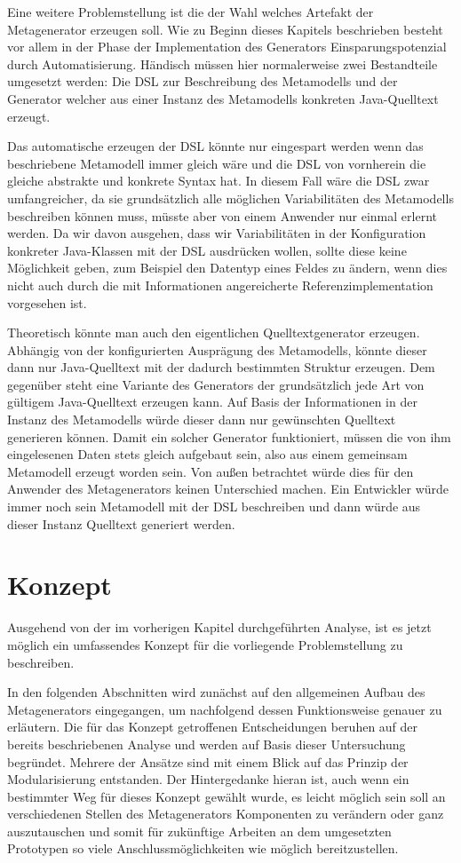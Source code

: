 \documentclass[12pt,oneside,a4paper,parskip]{scrbook}
\begin{document}
Eine weitere Problemstellung ist die der Wahl welches Artefakt der Metagenerator erzeugen soll. Wie zu Beginn dieses Kapitels beschrieben besteht vor allem in der Phase der Implementation des Generators Einsparungspotenzial durch Automatisierung. Händisch müssen hier normalerweise zwei Bestandteile umgesetzt werden: Die DSL zur Beschreibung des Metamodells und der Generator welcher aus einer Instanz des Metamodells konkreten Java-Quelltext erzeugt. 

Das automatische erzeugen der DSL könnte nur eingespart werden wenn das beschriebene Metamodell immer gleich wäre und die DSL von vornherein die gleiche abstrakte und konkrete Syntax hat. In diesem Fall wäre die DSL zwar umfangreicher, da sie grundsätzlich alle möglichen Variabilitäten des Metamodells beschreiben können muss, müsste aber von einem Anwender nur einmal erlernt werden. Da wir davon ausgehen, dass wir Variabilitäten in der Konfiguration konkreter Java-Klassen mit der DSL ausdrücken wollen, sollte diese keine Möglichkeit geben, zum Beispiel den Datentyp eines Feldes zu ändern, wenn dies nicht auch durch die mit Informationen angereicherte Referenzimplementation vorgesehen ist.

Theoretisch könnte man auch den eigentlichen Quelltextgenerator erzeugen. Abhängig von der konfigurierten Ausprägung des Metamodells, könnte dieser dann nur Java-Quelltext mit der dadurch bestimmten Struktur erzeugen. Dem gegenüber steht eine Variante des Generators der grundsätzlich jede Art von gültigem Java-Quelltext erzeugen kann. Auf Basis der Informationen in der Instanz des Metamodells würde dieser dann nur gewünschten Quelltext generieren können. Damit ein solcher Generator funktioniert, müssen die von ihm eingelesenen Daten stets gleich aufgebaut sein, also aus einem gemeinsam Metamodell erzeugt worden sein. Von außen betrachtet würde dies für den Anwender des Metagenerators keinen Unterschied machen. Ein Entwickler würde immer noch sein Metamodell mit der DSL beschreiben und dann würde aus dieser Instanz Quelltext generiert werden.

\chapter{Konzept}

Ausgehend von der im vorherigen Kapitel durchgeführten Analyse, ist es jetzt möglich ein umfassendes Konzept für die vorliegende Problemstellung zu beschreiben.

In den folgenden Abschnitten wird zunächst auf den allgemeinen Aufbau des Metagenerators eingegangen, um nachfolgend dessen Funktionsweise genauer zu erläutern. Die für das Konzept getroffenen Entscheidungen beruhen auf der bereits beschriebenen Analyse und werden auf Basis dieser Untersuchung begründet. Mehrere der Ansätze sind mit einem Blick auf das Prinzip der Modularisierung entstanden. Der Hintergedanke hieran ist, auch wenn ein bestimmter Weg für dieses Konzept gewählt wurde, es leicht möglich sein soll an verschiedenen Stellen des Metagenerators Komponenten zu verändern oder ganz auszutauschen und somit für zukünftige Arbeiten an dem umgesetzten Prototypen so viele Anschlussmöglichkeiten wie möglich bereitzustellen.
\end{document}
